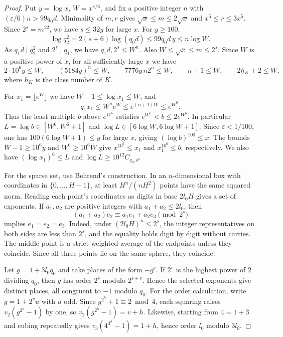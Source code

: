\begin{proof}
Put \(y=\log x\), \(W=x^{\varepsilon/6}\), and fix a positive integer \(n\)
with \((\varepsilon/6)n>99q_0d\). Minimality of \(m,r\) gives
\(\sqrt{x}\le m\le2\sqrt{x}\) and \(x^5\le r\le3x^5\).
Since \(2^s=m^{22}\), we have \(s\le32y\) for large \(x\). For \(y\ge100\),
\[
 \log q_2^2=2(s+6)\log(q_0d)\le99q_0d\,y\le n\log W .
\]
As \(q_1d\mid q_2^2\) and \(2^s\mid q_1\), we have \(q_1d,2^s\le W^n\).
Also \(W\le\sqrt{x}\le m\le 2^s\). Since \(W\) is a positive power of \(x\),
for all sufficiently large \(x\) we have
\[
 2\cdot10^6 y\le W,\qquad
 (5184y)^n\le W,\qquad 7776y\,n2^n\le W,\qquad
 n+1\le W,\qquad 2h_K+2\le W ,
\]
where \(h_K\) is the class number of \(K\).

For \(x_1=\lfloor e^W\rfloor\) we have \(W-1\le\log x_1\le W\), and
\[
 q_1x_1\le W^n e^W\le e^{(n+1)W}\le e^{W^6}.
\]
Thus the least multiple \(b\) above \(e^{W^6}\) satisfies
\(e^{W^6}<b\le2e^{W^6}\). In particular \(L=\log b\in[W^6,W^6+1]\) and
\(\log L\in[6\log W,6\log W+1]\).
Since \(\varepsilon<1/100\), one has \(100(6\log W+1)\le y\) for large
\(x\), giving \((\log b)^{100}\le x\).
The bounds \(W-1\ge10^6 y\) and \(W^6\ge10^6W\) give
\(x^{10^6}\le x_1\) and \(x_1^{10^6}\le b\), respectively.
We also have \((\log x_1)^6\le L\) and \(\log L\ge10^{12}C_{q_0,d}\).

For the sparse set, use Behrend's construction. In an \(n\)-dimensional
box with coordinates in \(\{0,\ldots,H-1\}\), at least \(H^n/(nH^2)\)
points have the same squared norm. Reading each point's coordinates as
digits in base \(2l_0H\) gives a set of exponents.
If \(a_1,a_2\) are positive integers with \(a_1+a_2\le2l_0\), then
\[
 (a_1+a_2)e_2\equiv a_1 e_1+a_2 e_3 \pmod {2^s}
\]
implies \(e_1=e_2=e_3\). Indeed, under \((2l_0H)^n\le2^s\), the integer
representatives on both sides are less than \(2^s\), and the equality
holds digit by digit without carries. The middle point is a strict
weighted average of the endpoints unless they coincide. Since all three
points lie on the same sphere, they coincide.

Let \(g=1+3l_0q_0\) and take places of the form \(-g^e\).
If \(2^v\) is the highest power of \(2\) dividing \(q_0\), then \(g\) has
order \(2^s\) modulo \(2^{s+v}\). Hence the selected exponents give
distinct places, all congruent to \(-1\) modulo \(q_0\).
For the order calculation, write \(g=1+2^v u\) with \(u\) odd.
Since \(g^{2^h}+1\equiv2\bmod4\), each squaring raises \(v_2(g^{2^h}-1)\)
by one, so \(v_2(g^{2^h}-1)=v+h\).
Likewise, starting from \(4=1+3\) and cubing repeatedly gives
\(v_3(4^{3^h}-1)=1+h\), hence order \(l_0\) modulo \(3l_0\).


\end{proof}
